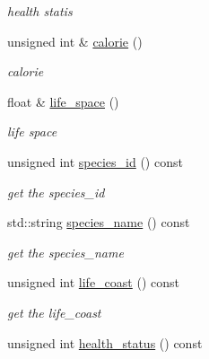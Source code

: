 \begin{DoxyCompactItemize}
\begin{DoxyCompactList}\small\item\em health statis \end{DoxyCompactList}\item 
unsigned int \& \hyperlink{classSpecied_a26cb3955f48f79b3d5f20a604ca3dd01}{calorie} ()
\begin{DoxyCompactList}\small\item\em calorie \end{DoxyCompactList}\item 
float \& \hyperlink{classSpecied_ab3f331fb396f5016d2297fcc2769375e}{life\_\-space} ()
\begin{DoxyCompactList}\small\item\em life space \end{DoxyCompactList}\item 
\hypertarget{classSpecied_a14bebd5e8b33ab0144f26e5887deaa56}{
unsigned int \hyperlink{classSpecied_a14bebd5e8b33ab0144f26e5887deaa56}{species\_\-id} () const }
\label{classSpecied_a14bebd5e8b33ab0144f26e5887deaa56}

\begin{DoxyCompactList}\small\item\em get the species\_\-id \end{DoxyCompactList}\item 
\hypertarget{classSpecied_a05225e19665a98ebb82e45887cc6632d}{
std::string \hyperlink{classSpecied_a05225e19665a98ebb82e45887cc6632d}{species\_\-name} () const }
\label{classSpecied_a05225e19665a98ebb82e45887cc6632d}

\begin{DoxyCompactList}\small\item\em get the species\_\-name \end{DoxyCompactList}\item 
\hypertarget{classSpecied_a7e442dcdc637e305d736de629d6dd63f}{
unsigned int \hyperlink{classSpecied_a7e442dcdc637e305d736de629d6dd63f}{life\_\-coast} () const }
\label{classSpecied_a7e442dcdc637e305d736de629d6dd63f}

\begin{DoxyCompactList}\small\item\em get the life\_\-coast \end{DoxyCompactList}\item 
\hypertarget{classSpecied_ad10fd46085a273d0402cabc97519a1d9}{
unsigned int \hyperlink{classSpecied_ad10fd46085a273d0402cabc97519a1d9}{health\_\-status} () const }
\label{classSpecied_ad10fd46085a273d0402cabc97519a1d9}


\end{DoxyCompactItemize}
